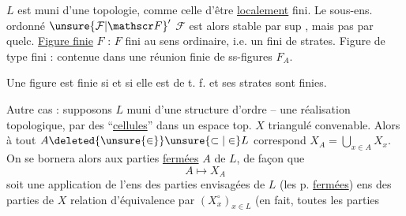 $L$ est muni d'une topologie, comme celle d'être \uline{localement} fini. Le sous-ens.
ordonné ${\unsure{\mathcal F|\mathscr F}}'$  $\mathcal F$ est alors stable par sup , mais pas   par 
quelc. \uline{Figure finie} $F$ :  $F$ fini au sens ordinaire, i.e. un  fini de strates. Figure de type fini : contenue
dans une réunion finie de ss-figures $F_A$.

 Une figure est  finie  si et  si elle est de t. f. et ses strates sont finies.

Autre cas : supposons $L$ muni d'une structure d'ordre --    une réalisation topologique, par des ``\uline{cellules}''  dans un espace
top. $X$ triangulé convenable. Alors à tout $A\deleted{\unsure{\in}}\unsure{\subset|\in}L$ correspond  $X_A=\bigcup_{x\in A}X_x$.
On se bornera alors  aux parties \uline{fermées} $A$ de $L$, de façon que
\[ A\longmapsto X_A \]
soit une application  de l'ens des parties envisagées de $L$ (les p. \uline{fermées})
 ens des parties  de $X$    relation d'équivalence  par  $(X_x^\circ)_{x\in L}$ (en fait, toutes les parties
